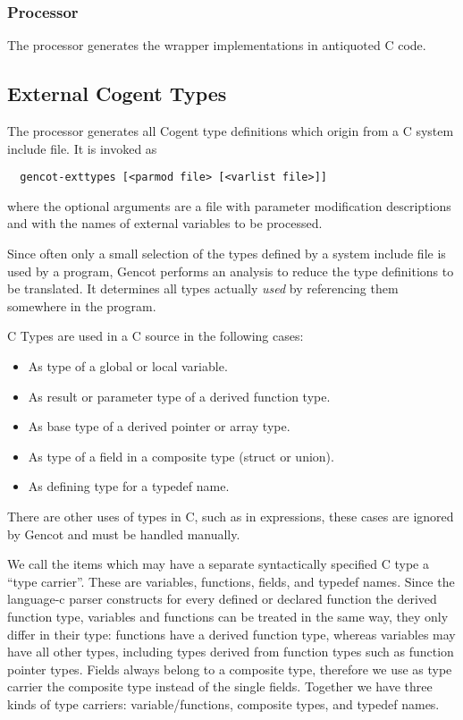 \subsubsection{Processor }

The processor  generates the wrapper implementations in antiquoted C code.

\subsection{External Cogent Types}
\label{impl-ccomps-exttypes}

The processor  generates all Cogent type definitions which origin from a C system include file.
It is invoked as
\begin{verbatim}
  gencot-exttypes [<parmod file> [<varlist file>]]
\end{verbatim}
where the optional arguments are a file with parameter modification descriptions and with the names of external
variables to be processed.

Since often only a small selection of the types defined by a system include file is used by a program, Gencot performs 
an analysis to reduce the type definitions to be translated. It determines all types actually \textit{used} by
referencing them somewhere in the program.

C Types are used in a C source in the following cases:
\begin{itemize}
\item As type of a global or local variable.
\item As result or parameter type of a derived function type.
\item As base type of a derived pointer or array type.
\item As type of a field in a composite type (struct or union).
\item As defining type for a typedef name.
\end{itemize}
There are other uses of types in C, such as in  expressions, these cases are ignored by Gencot and 
must be handled manually.

We call the items which may have a separate syntactically
specified C type a ``type carrier''. These are variables, functions, fields, and typedef names. Since the language-c
parser constructs for every defined or declared function the derived function type, variables and functions
can be treated in the same way, they only differ in their type: functions have a derived function type, whereas
variables may have all other types, including types derived from function types such as function pointer types. Fields 
always belong to a composite type, therefore we use as type carrier the composite type instead of the single fields.
Together we have three kinds of type carriers: variable/functions, composite types, and typedef names.

